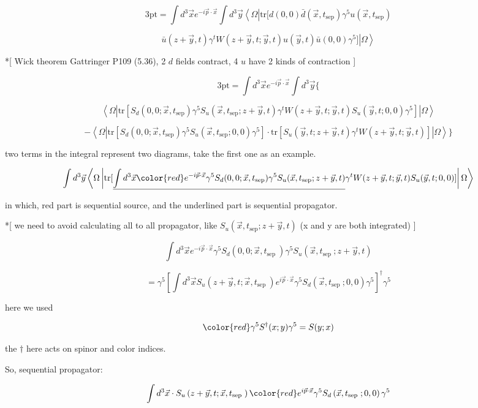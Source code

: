 \documentclass[11pt]{article} %
\begin{document}
\[ \text{3pt} = \int d^{3} \vec{x} e^{-i \vec{p} \cdot \vec{x}} \int d^3 \vec{y}\left\langle\Omega\left| \text{tr}[ d(0, 0) \bar{d}\left(\vec{x}, t_{\text {sep}}\right) \gamma^{5} u\left(\vec{x}, t_{\text {sep}}\right)   \right.\right.\]

\[\left. \left. \bar{u}(z+\vec{y}, t) \gamma^{t} W(z+\vec{y}, t ; \vec{y}, t) u(\vec{y}, t)  \bar{u}(0, 0) \gamma^{5}  ] \right| \Omega\right\rangle \]

*[ Wick theorem Gattringer P109 (5.36), 2 $d$ fields contract, 4 $u$ have 2 kinds of contraction ]

\[ \text{3pt} = \int d^{3} \vec{x} e^{-i \vec{p} \cdot \vec{x}} \int d^3 \vec{y} \{ \]

\[ \left\langle\Omega\left| \text{tr}[ S_d(0,0;\vec{x},t_{\text{sep}}) \gamma^{5} S_u(\vec{x},t_{\text{sep}};z+\vec{y},t) \gamma^{t} W(z+\vec{y}, t ; \vec{y}, t) S_u(\vec{y},t;0,0) \gamma^{5}  ] \right| \Omega\right\rangle \]

\[ - \left\langle\Omega\left| \text{tr}[ S_d(0,0;\vec{x},t_{\text{sep}}) \gamma^{5} S_u(\vec{x},t_{\text{sep}};0,0) \gamma^{5}] \cdot \text{tr}[ S_u(\vec{y},t;z+\vec{y},t) \gamma^{t} W(z+\vec{y}, t ; \vec{y}, t) ] \right| \Omega\right\rangle \} \]

two terms in the integral represent two diagrams, take the first one as an example.

\[ \int d^3 \vec{y} \left\langle\Omega\left| \text{tr}[  \underline{  \int d^{3} \vec{x} {\color{red} e^{-i \vec{p} \cdot \vec{x}} \gamma^{5}  S_d(0,0;\vec{x},t_{\text{sep}}) \gamma^{5} } S_u(\vec{x},t_{\text{sep}};z+\vec{y},t) }  \gamma^{t} W(z+\vec{y}, t ; \vec{y}, t) S_u(\vec{y},t;0,0)  ] \right| \Omega\right\rangle \]

in which, red part is sequential source, and the underlined part is sequential propagator.

*[ we need to avoid calculating all to all propagator, like $S_u(\vec{x},t_{\text{sep}};z+\vec{y},t)$ (x and y are both integrated) ]

\[ \int d^{3} \vec{x} e^{-i \vec{p} \cdot \vec{x}} \gamma^{5} S_{d}\left(0,0 ; \vec{x}, t_{\text {sep }}\right) \gamma^{5} S_{u}\left(\vec{x}, t_{\text {sep }} ; z+\vec{y}, t\right) \]

\[ = \gamma^5 [\int d^{3} \vec{x} S_{u}\left(z+\vec{y}, t; \vec{x}, t_{\text {sep }} \right) e^{i \vec{p} \cdot \vec{x}} \gamma^{5} S_{d}\left(\vec{x}, t_{\text {sep }}; 0,0 \right) \gamma^{5} ]^{\dagger} \gamma^5 \]

here we used 

\[ {\color{red} \gamma^5 S^{\dagger}(x;y) \gamma^5 = S(y;x) } \]

the $\dagger$ here acts on spinor and color indices.

So, sequential propagator:

\[ \int d^{3} \vec{x} \cdot S_{u}\left(z+\vec{y}, t; \vec{x}, t_{\text {sep }} \right) {\color{red} e^{i \vec{p} \cdot \vec{x}} \gamma^{5} S_{d}\left(\vec{x}, t_{\text {sep }}; 0,0 \right) \gamma^{5} } \]
\end{document}
